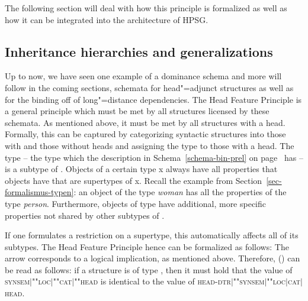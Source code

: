 The following section will deal with how this principle is formalized as well as how it can be integrated into the architecture of HPSG.

\subsection{Inheritance hierarchies and generalizations}
\label{Abschnitt-Vererbung-HPSG}\label{sec-types-hpsg}

\largerpage[-2]
Up to now, we have seen one example of a dominance schema and more will follow in the coming sections, \eg schemata for head"=adjunct structures as well
as for the binding off of long"=distance dependencies. The Head Feature Principle is a general
principle which must be met by all structures licensed by these schemata. As mentioned above, it must be met by all structures with a head. Formally, this can be captured by categorizing syntactic structures into those with and those without
heads and assigning the type  to those with a head.
The type  -- the type which the description in
Schema~\ref{schema-bin-prel} on page~\pageref{schema-bin-prel} has -- is a subtype
of . Objects of a certain type x always have all properties that objects
have that are supertypes of x. Recall the example from Section~\ref{sec-formalismus-typen}:
an object of the type \textit{woman} has all the properties of the type
\textit{person}. Furthermore, objects of type  have additional, more specific properties not shared by other subtypes of .

If one formulates a restriction on a supertype, this automatically affects all of its subtypes. The
Head Feature Principle hence can be formalized as follows:
\ea
{} \impl
{} 
\z
The arrow\is{\impl} corresponds to a logical implication, as mentioned above. Therefore, () can be read as follows:
if a structure is of type , then it must hold that the value of
\textsc{synsem$|$""loc$|$""cat$|$""head} is identical to the value of \textsc{head-dtr$|$""synsem$|$""loc$|$cat$|$head}.
  
